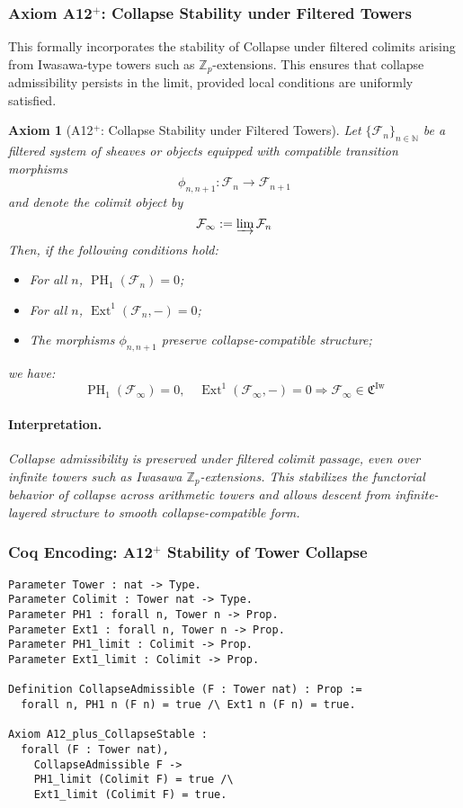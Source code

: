 \documentclass[11pt]{article}
\newtheorem{axiom}{Axiom}[section]
\DeclareMathOperator{\Ext}{Ext}
\DeclareMathOperator{\PH}{PH}
\begin{document}
\subsubsection*{Axiom A12$^{+}$: Collapse Stability under Filtered Towers}

This formally incorporates the stability of Collapse under filtered colimits arising from Iwasawa-type towers such as $\mathbb{Z}_p$-extensions. This ensures that collapse admissibility persists in the limit, provided local conditions are uniformly satisfied.

\begin{axiom}[A12$^{+}$: Collapse Stability under Filtered Towers]
Let $\{ \mathcal{F}_n \}_{n \in \mathbb{N}}$ be a filtered system of sheaves or objects equipped with compatible transition morphisms
\[
\phi_{n,n+1} : \mathcal{F}_n \to \mathcal{F}_{n+1}
\]
and denote the colimit object by
\[
\mathcal{F}_\infty := \varinjlim \mathcal{F}_n
\]
Then, if the following conditions hold:
\begin{itemize}
  \item[(i)] For all $n$, $\PH_1(\mathcal{F}_n) = 0$;
  \item[(ii)] For all $n$, $\Ext^1(\mathcal{F}_n, -) = 0$;
  \item[(iii)] The morphisms $\phi_{n,n+1}$ preserve collapse-compatible structure;
\end{itemize}
we have:
\[
\PH_1(\mathcal{F}_\infty) = 0, \quad \Ext^1(\mathcal{F}_\infty, -) = 0
\Rightarrow
\mathcal{F}_\infty \in \mathfrak{C}^{\mathrm{Iw}}
\]

\paragraph{Interpretation.}
Collapse admissibility is preserved under filtered colimit passage, even over infinite towers such as Iwasawa $\mathbb{Z}_p$-extensions. This stabilizes the functorial behavior of collapse across arithmetic towers and allows descent from infinite-layered structure to smooth collapse-compatible form.
\end{axiom}

\subsubsection*{Coq Encoding: A12$^{+}$ Stability of Tower Collapse}

\begin{lstlisting}[language=Coq, caption=Axiom A12⁺: Collapse-Stable Colimit over Tower]
Parameter Tower : nat -> Type.
Parameter Colimit : Tower nat -> Type.
Parameter PH1 : forall n, Tower n -> Prop.
Parameter Ext1 : forall n, Tower n -> Prop.
Parameter PH1_limit : Colimit -> Prop.
Parameter Ext1_limit : Colimit -> Prop.

Definition CollapseAdmissible (F : Tower nat) : Prop :=
  forall n, PH1 n (F n) = true /\ Ext1 n (F n) = true.

Axiom A12_plus_CollapseStable :
  forall (F : Tower nat),
    CollapseAdmissible F ->
    PH1_limit (Colimit F) = true /\
    Ext1_limit (Colimit F) = true.
\end{lstlisting}
\end{document}
